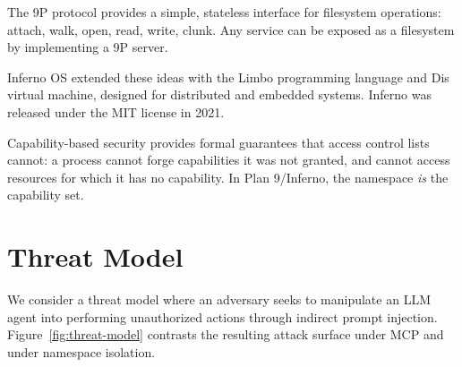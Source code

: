 \documentclass[acmsmall,screen,review]{acmart}
\begin{document}
The 9P protocol \cite{9p2000} provides a simple, stateless interface for filesystem operations: attach, walk, open, read, write, clunk. Any service can be exposed as a filesystem by implementing a 9P server.

Inferno OS \cite{dorward1997inferno} extended these ideas with the Limbo programming language and Dis virtual machine, designed for distributed and embedded systems. Inferno was released under the MIT license in 2021.

Capability-based security \cite{dennis1966capabilities} provides formal guarantees that access control lists cannot: a process cannot forge capabilities it was not granted, and cannot access resources for which it has no capability. In Plan 9/Inferno, the namespace \textit{is} the capability set.

\section{Threat Model}
\label{sec:threat-model}

We consider a threat model where an adversary seeks to manipulate an LLM agent into performing unauthorized actions through indirect prompt injection. Figure~\ref{fig:threat-model} contrasts the resulting attack surface under MCP and under namespace isolation.
\end{document}
